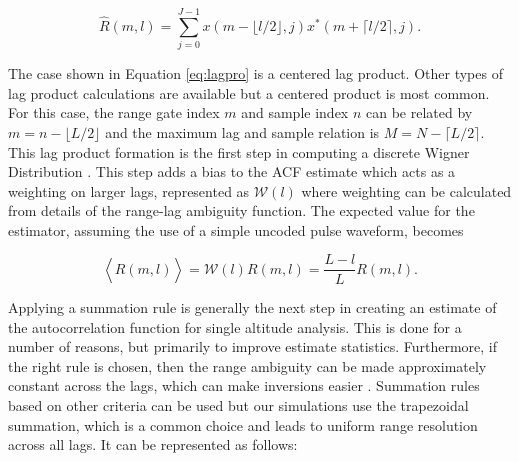 \begin{equation}
\label{eq:lagpro}
\widehat{R}(m,l) = \displaystyle\sum\limits_{j=0}^{J-1} x(m-\lfloor l/2\rfloor,j)x^*(m+\lceil l/2 \rceil,j).
\end{equation}

The case shown in Equation \ref{eq:lagpro} is a centered lag product.  Other types of lag product calculations are available but a centered product is most common. For this case, the range gate index $m$ and sample index $n$ can be related by $m=n-\lfloor L/2\rfloor$ and the maximum lag and sample relation is $M=N-\lceil L/2 \rceil$.  This lag product formation is the first step in computing a discrete Wigner Distribution \cite{TFAcohen}. This  step adds a bias to the ACF estimate which acts as a weighting on larger lags, represented as $\mathcal{W}(l)$ where weighting can be calculated from details of the range-lag ambiguity function. The expected value for the estimator, assuming the use of a simple uncoded pulse waveform, becomes

\begin{equation}
\label{eq:lagprobias}
\left\langle\widehat{R}(m,l) \right\rangle = \mathcal{W}(l)R(m,l) =\frac{L-l}{L}R(m,l).
\end{equation}

%
%

Applying a summation rule is generally the next step in creating an estimate of the autocorrelation function for single altitude analysis. This is done for a number of reasons, but primarily to improve estimate statistics.  Furthermore, if the right rule is chosen, then the range ambiguity can be made approximately constant across the lags, which can make inversions easier \cite{nygren1996}. Summation rules based on other criteria can be used but our simulations use the trapezoidal summation, which is a common choice and leads to uniform range resolution across all lags. It can be represented as follows:

